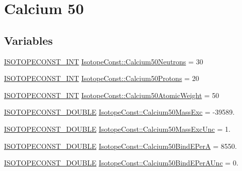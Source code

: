 \hypertarget{group___isotope_const-_calcium-_ca50}{}\section{Calcium 50}
\label{group___isotope_const-_calcium-_ca50}
\subsection*{Variables}
\begin{DoxyCompactItemize}
\item 
\mbox{\hyperlink{group___isotope_const-_macros_ga5f18360b3e99483a35c32d789e62621c}{I\+S\+O\+T\+O\+P\+E\+C\+O\+N\+S\+T\+\_\+\+I\+NT}} \mbox{\hyperlink{group___isotope_const-_calcium-_ca50_gafc1b33b675d54b43e86360a193ec731c}{Isotope\+Const\+::\+Calcium50\+Neutrons}} = 30
\item 
\mbox{\hyperlink{group___isotope_const-_macros_ga5f18360b3e99483a35c32d789e62621c}{I\+S\+O\+T\+O\+P\+E\+C\+O\+N\+S\+T\+\_\+\+I\+NT}} \mbox{\hyperlink{group___isotope_const-_calcium-_ca50_ga1a1de08e3b31d50d57827aec17f84630}{Isotope\+Const\+::\+Calcium50\+Protons}} = 20
\item 
\mbox{\hyperlink{group___isotope_const-_macros_ga5f18360b3e99483a35c32d789e62621c}{I\+S\+O\+T\+O\+P\+E\+C\+O\+N\+S\+T\+\_\+\+I\+NT}} \mbox{\hyperlink{group___isotope_const-_calcium-_ca50_gaca7f7bae555ed2acfbd43df9891154ff}{Isotope\+Const\+::\+Calcium50\+Atomic\+Weight}} = 50
\item 
\mbox{\hyperlink{group___isotope_const-_macros_ga8f45a7272ce02c0b4c65c44636ed719a}{I\+S\+O\+T\+O\+P\+E\+C\+O\+N\+S\+T\+\_\+\+D\+O\+U\+B\+LE}} \mbox{\hyperlink{group___isotope_const-_calcium-_ca50_gae72963d3782dec32f9316c449361fdb4}{Isotope\+Const\+::\+Calcium50\+Mass\+Exc}} = -\/39589.
\item 
\mbox{\hyperlink{group___isotope_const-_macros_ga8f45a7272ce02c0b4c65c44636ed719a}{I\+S\+O\+T\+O\+P\+E\+C\+O\+N\+S\+T\+\_\+\+D\+O\+U\+B\+LE}} \mbox{\hyperlink{group___isotope_const-_calcium-_ca50_ga8221703707f2dafbb938aa2cd4546f03}{Isotope\+Const\+::\+Calcium50\+Mass\+Exc\+Unc}} = 1.
\item 
\mbox{\hyperlink{group___isotope_const-_macros_ga8f45a7272ce02c0b4c65c44636ed719a}{I\+S\+O\+T\+O\+P\+E\+C\+O\+N\+S\+T\+\_\+\+D\+O\+U\+B\+LE}} \mbox{\hyperlink{group___isotope_const-_calcium-_ca50_gaeeeb58f7a8b75d1c5a295de244645dd9}{Isotope\+Const\+::\+Calcium50\+Bind\+E\+PerA}} = 8550.
\item 
\mbox{\hyperlink{group___isotope_const-_macros_ga8f45a7272ce02c0b4c65c44636ed719a}{I\+S\+O\+T\+O\+P\+E\+C\+O\+N\+S\+T\+\_\+\+D\+O\+U\+B\+LE}} \mbox{\hyperlink{group___isotope_const-_calcium-_ca50_gaa8a8b6c2276e4a756f4762fc930191d6}{Isotope\+Const\+::\+Calcium50\+Bind\+E\+Per\+A\+Unc}} = 0.

\end{DoxyCompactItemize}
